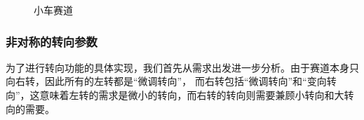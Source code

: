 \documentclass[a4paper,twoside,zihao=5,UTF8]{ctexart}
\begin{document}
\begin{spacing}{1.2}
\begin{figure}[htb]
    \centering
	\caption{小车赛道}
	\label{fig:car}
\end{figure}

\subsubsection{非对称的转向参数}

为了进行转向功能的具体实现，我们首先从需求出发进一步分析。由于赛道本身只向右转，因此所有的左转都是“微调转向”，
而右转包括“微调转向”和“变向转向”，这意味着左转的需求是微小的转向，而右转的转向则需要兼顾小转向和大转向的需要。


\end{spacing}
\end{document}
